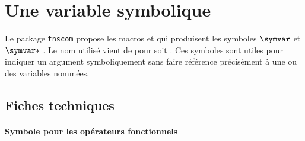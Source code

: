 \documentclass[12pt,a4paper]{article}
\begin{document}
\section{Une variable \og symbolique \fg{}}

Le package \verb+tnscom+ propose les macros  et  qui produisent les symboles $\symvar$ et $\symvar*$ . Le nom utilisé vient de  pour   soit .
Ces symboles sont utiles pour indiquer un argument symboliquement sans faire référence précisément à une ou des variables nommées.




\subsection{Fiches techniques}

\paragraph{Symbole pour les opérateurs fonctionnels}


\end{document}
